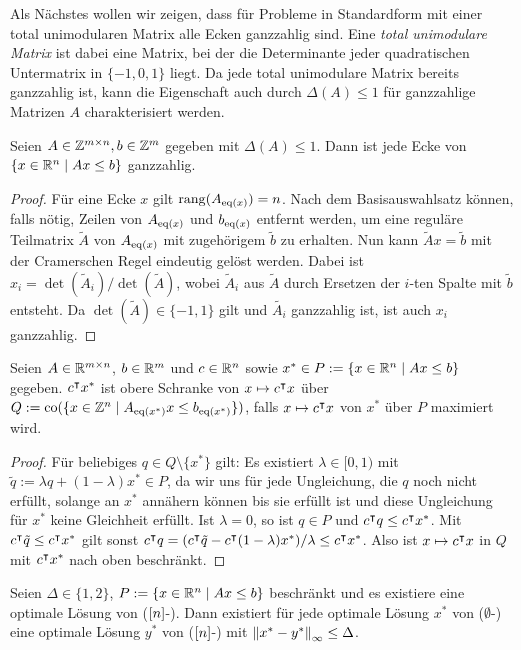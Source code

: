 Als Nächstes wollen wir zeigen, dass für Probleme in Standardform mit einer total unimodularen Matrix alle Ecken ganzzahlig sind.
Eine \emph{total unimodulare Matrix} ist dabei eine Matrix, bei der die Determinante jeder quadratischen Untermatrix in $\{-1,0,1\}$ liegt.
Da jede total unimodulare Matrix bereits ganzzahlig ist, kann die Eigenschaft auch durch $\Delta(A)\leq 1$ für ganzzahlige Matrizen $A$ charakterisiert werden.

\begin{lemma}\label{lem:unimodular}
	Seien $A\in\mathbb{Z}^{m\times n},b\in\mathbb{Z}^m$ gegeben mit $\Delta(A)\leq 1$.
	Dann ist jede Ecke von $\{x\in\mathbb{R}^n \mid Ax\leq b \}$ ganzzahlig.
\end{lemma}
\begin{proof}
	Für eine Ecke $x$ gilt $\operatorname{rang}(A_{\operatorname{eq}(x)})=n$.
	Nach dem Basisauswahlsatz können, falls nötig, Zeilen von $A_{\operatorname{eq}(x)}$ und $b_{\operatorname{eq}(x)}$ entfernt werden, um eine reguläre Teilmatrix $\tilde{A}$ von $A_{\operatorname{eq}(x)}$ mit zugehörigem $\tilde{b}$ zu erhalten.
	Nun kann $\tilde{A}x=\tilde{b}$ mit der Cramerschen Regel eindeutig gelöst werden.
	Dabei ist $x_i=\det(\tilde{A}_i)/\det(\tilde{A})$, wobei $\tilde{A}_i$ aus $\tilde{A}$ durch Ersetzen der $i$-ten Spalte mit $\tilde{b}$ entsteht.
	Da $\det(\tilde{A})\in\{-1,1\}$ gilt und $\tilde{A_i}$ ganzzahlig ist, ist auch $x_i$ ganzzahlig.
\end{proof}
\begin{lemma}\label{lem:q-upper-bound}
	Seien $A\in\mathbb{R}^{m\times n}$, $b\in\mathbb{R}^m$ und $c\in\mathbb{R}^n$ sowie $x^*\in P:=\{ x\in\mathbb{R}^n \mid Ax\leq b \}$ gegeben.
	 $c^\intercal x^*$ ist obere Schranke von $x\mapsto c^\intercal x$ über $Q:=\operatorname{co}(\{x\in\mathbb{Z}^n \mid A_{\operatorname{eq}(x^*)}x \leq b_{\operatorname{eq}(x^*)} \})$, falls $x\mapsto c^\intercal x$  von $x^*$ über $P$ maximiert wird.
\end{lemma}
\begin{proof}
	Für beliebiges $q\in Q\setminus\{x^*\}$ gilt:
	Es existiert $\lambda\in[0,1)$ mit $\tilde{q}:=\lambda q+(1-\lambda)x^*\in P$, da wir uns für jede Ungleichung, die $q$ noch nicht erfüllt, solange an $x^*$ annähern können bis sie erfüllt ist und diese Ungleichung für $x^*$ keine Gleichheit erfüllt.
	Ist $\lambda=0$, so ist $q\in P$ und $c^\intercal q\leq c^\intercal x^*$. Mit $c^\intercal \tilde{q} \leq c^\intercal x^*$ gilt sonst $c^\intercal q=(c^\intercal \tilde{q} - c^\intercal(1-\lambda)x^*)/\lambda \leq c^\intercal x^*$.
	Also ist $x\mapsto c^\intercal x$ in $Q$ mit $c^\intercal x^*$ nach oben beschränkt.
\end{proof}
\begin{lemma}\label{lem:i-n-j-e}
	Seien $\Delta\in\{1,2\}$, $P:=\{x\in\mathbb{R}^n \mid Ax\leq b \}$ beschränkt und es existiere eine optimale Lösung von ($[n]$-\MIPI).
	Dann existiert für jede optimale Lösung $x^*$ von ($\emptyset$-\MIPI) eine optimale Lösung $y^*$ von ($[n]$-\MIPI) mit $\left\lVert x^*-y^*\right\rVert_\infty\leq \Delta$.
\end{lemma}

